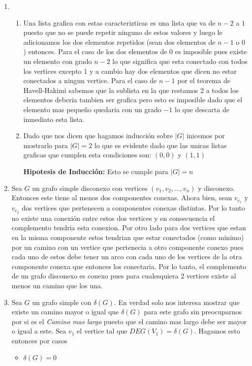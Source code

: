 


    

    \begin{enumerate}
      \item 
	\begin{enumerate}
	  \item 
	    
	    Una lista grafica con estas caracterizticas es una lista que va de $n-2$ a $1$ puesto que no se puede repetir ninguno de estos valores y luego le adicionamos los dos elementos repetidos (sean dos elementos de $n-1$ o $0$ ) entonces. Para el caso de los dos elementos de $0$ es imposible pues existe un elemento con grado $n-2$ lo que significa que esta conectado con todos los vertices excepto 1 y a cambio hay dos elementos que dicen no estar conectados a ningun vertice. Para el caso de $n-1$ por el teorema de Havell-Hakimi sabemos que la sublista en la que restamos 2 a todos los elementos deberia tambien ser grafica pero esto es imposible dado que el elemento mas pequeño quedaria con un grado $-1$ lo que descarta de inmediato esta lista.
	  \item Dado que nos dicen que hagamos inducción sobre $|G|$ inicemos por mostrarlo para $|G|=2$ lo que es evidente dado que las unicas listas graficas que cumplen esta condiciones son: $\left( 0,0 \right) $ y $\left( 1,1 \right) $ 
	    
	    \textbf{Hipotesis de Inducción:} Esto se cumple para $|G| = n$
	\end{enumerate}
      \item Sea $G$ un grafo simple disconexo con vertices $(v_1,v_2,\ldots,v_n)$ y disconexo. Entonces este tiene al menos dos componentes conexas. Ahora bien, sean $v_{c_1}$ y $v_{c_2}$ dos vertices que pertenecen a componentes conexas distintas. Por lo tanto no existe una conexión entre estos dos vertices y en consecuencia el complemento tendria esta conexion. Por otro lado para dos vertices que estan en la misma componente estos tendrian que estar conectados (como minimo) por un camino con un vertice que pertenecia a otro componente conexo pues cada uno de estos debe tener un arco con cada uno de los vertices de la otra componente conexa que entonces los conectaria. Por lo tanto, el complemento de un grafo disconexo es conexo pues para cualesquiera 2 vertices existe al menos un camino que los una.
      \item Sea $G$ un grafo simple con $\delta\left( G \right) $. En verdad solo nos interesa mostrar que existe un camino mayor o igual que $\delta\left( G \right) $ para este grafo sin preocuparnos por si es el \textit{Camino mas largo} puesto que el camino mas largo debe ser mayor o igual a este. Sea $v_1$ el vertice tal que $DEG\left( V_1 \right) = \delta\left( G \right) $. Hagamos esto entonces por casos
	\begin{itemize}
	  \item $\delta\left( G \right) = 0$ 


\end{itemize}
\end{enumerate}
